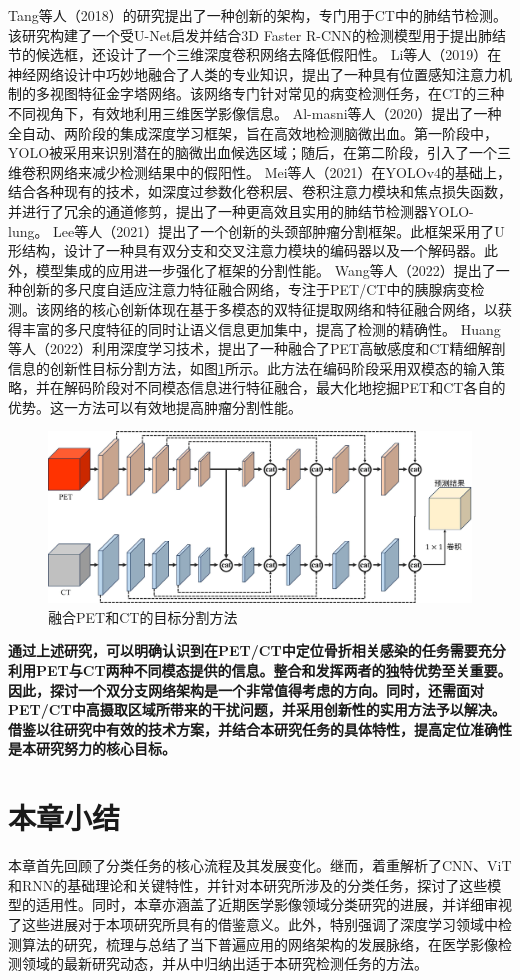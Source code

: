 Tang等人\cite{tang2018automated}（2018）的研究提出了一种创新的架构，专门用于CT中的肺结节检测。该研究构建了一个受U-Net启发并结合3D Faster R-CNN的检测模型用于提出肺结节的候选框，还设计了一个三维深度卷积网络去降低假阳性。
Li等人\cite{li2019mvp}（2019）在神经网络设计中巧妙地融合了人类的专业知识，提出了一种具有位置感知注意力机制的多视图特征金字塔网络。该网络专门针对常见的病变检测任务，在CT的三种不同视角下，有效地利用三维医学影像信息。
Al-masni等人\cite{al2020two}（2020）提出了一种全自动、两阶段的集成深度学习框架，旨在高效地检测脑微出血。第一阶段中，YOLO被采用来识别潜在的脑微出血候选区域；随后，在第二阶段，引入了一个三维卷积网络来减少检测结果中的假阳性。
Mei等人\cite{mei2021yolo}（2021）在YOLOv4的基础上，结合各种现有的技术，如深度过参数化卷积层、卷积注意力模块和焦点损失函数，并进行了冗余的通道修剪，提出了一种更高效且实用的肺结节检测器YOLO-lung。
Lee等人\cite{lee2021dual}（2021）提出了一个创新的头颈部肿瘤分割框架。此框架采用了U形结构，设计了一种具有双分支和交叉注意力模块的编码器以及一个解码器。此外，模型集成的应用进一步强化了框架的分割性能。
Wang等人\cite{wang2022maff}（2022）提出了一种创新的多尺度自适应注意力特征融合网络，专注于PET/CT中的胰腺病变检测。该网络的核心创新体现在基于多模态的双特征提取网络和特征融合网络，以获得丰富的多尺度特征的同时让语义信息更加集中，提高了检测的精确性。
Huang等人\cite{huang2022isa}（2022）利用深度学习技术，提出了一种融合了PET高敏感度和CT精细解剖信息的创新性目标分割方法，如图\ref{fig:chap02_isanet}所示。此方法在编码阶段采用双模态的输入策略，并在解码阶段对不同模态信息进行特征融合，最大化地挖掘PET和CT各自的优势。这一方法可以有效地提高肿瘤分割性能。

\begin{figure}[htbp]
  \centering
  \includegraphics[width=\textwidth]{figures/chap02_isanet.jpg}
  \caption{融合PET和CT的目标分割方法}
  \label{fig:chap02_isanet}
\end{figure}

\textbf{通过上述研究，可以明确认识到在PET/CT中定位骨折相关感染的任务需要充分利用PET与CT两种不同模态提供的信息。整合和发挥两者的独特优势至关重要。因此，探讨一个双分支网络架构是一个非常值得考虑的方向。同时，还需面对PET/CT中高摄取区域所带来的干扰问题，并采用创新性的实用方法予以解决。借鉴以往研究中有效的技术方案，并结合本研究任务的具体特性，提高定位准确性是本研究努力的核心目标。}

\section{本章小结}

本章首先回顾了分类任务的核心流程及其发展变化。继而，着重解析了CNN、ViT和RNN的基础理论和关键特性，并针对本研究所涉及的分类任务，探讨了这些模型的适用性。同时，本章亦涵盖了近期医学影像领域分类研究的进展，并详细审视了这些进展对于本项研究所具有的借鉴意义。此外，特别强调了深度学习领域中检测算法的研究，梳理与总结了当下普遍应用的网络架构的发展脉络，在医学影像检测领域的最新研究动态，并从中归纳出适于本研究检测任务的方法。